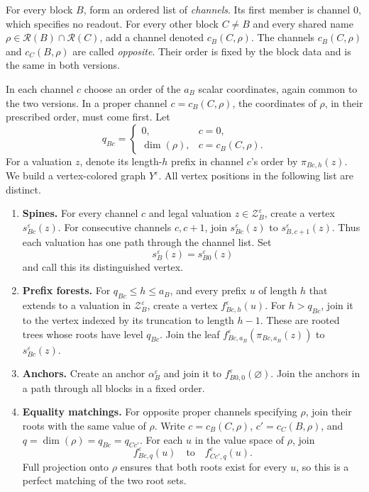 \documentclass[11pt]{article}
\theoremstyle{definition}
\begin{document}
For every block \(B\), form an ordered list of \emph{channels}.
Its first member is channel \(0\), which specifies no readout.
For every other block \(C\ne B\) and every shared name
\(\rho\in\mathcal R(B)\cap\mathcal R(C)\), add a channel denoted
\(c_B(C,\rho)\).
The channels \(c_B(C,\rho)\) and \(c_C(B,\rho)\) are called
\emph{opposite}.  Their order is fixed by the block data and is the
same in both versions.

In each channel \(c\) choose an order of the \(a_B\) scalar coordinates,
again common to the two versions.  In a proper channel
\(c=c_B(C,\rho)\), the coordinates of \(\rho\), in their prescribed
order, must come first.  Let
\[
 q_{Bc}=
 \begin{cases}
  0,&c=0,\\
  \dim(\rho),&c=c_B(C,\rho).
 \end{cases}
\]
For a valuation \(z\), denote its length-\(h\) prefix in channel \(c\)'s
order by \(\pi_{Bc,h}(z)\).
We build a vertex-colored graph \(Y^\varepsilon\).
All vertex positions in the following list are distinct.

\begin{enumerate}
\item
\textbf{Spines.}
For every channel \(c\) and legal valuation \(z\in\mathcal Z_B^\varepsilon\),
create a vertex \(s_{Bc}^\varepsilon(z)\).
For consecutive channels \(c,c+1\), join
\(s_{Bc}^\varepsilon(z)\) to \(s_{B,c+1}^\varepsilon(z)\).
Thus each valuation has one path through the channel list.
Set
\[
                  s_B^\varepsilon(z)=s_{B0}^\varepsilon(z)
\]
and call this its distinguished vertex.
\item
\textbf{Prefix forests.}
For \(q_{Bc}\le h\le a_B\), and every prefix \(u\) of length \(h\)
that extends to a valuation in \(\mathcal Z_B^\varepsilon\), create a vertex
\(f_{Bc,h}^\varepsilon(u)\).
For \(h>q_{Bc}\), join it to the vertex indexed by its truncation
to length \(h-1\).
These are rooted trees whose roots have level \(q_{Bc}\).
Join the leaf
\(f_{Bc,a_B}^\varepsilon(\pi_{Bc,a_B}(z))\)
to \(s_{Bc}^\varepsilon(z)\).
\item
\textbf{Anchors.}
Create an anchor \(\alpha_B^\varepsilon\) and join it to
\(f_{B0,0}^\varepsilon(\varnothing)\).
Join the anchors in a path through all blocks in a fixed order.
\item
\textbf{Equality matchings.}
For opposite proper channels specifying \(\rho\), join their roots
with the same value of \(\rho\).
Write \(c=c_B(C,\rho)\), \(c'=c_C(B,\rho)\), and
\(q=\dim(\rho)=q_{Bc}=q_{Cc'}\).
For each \(u\) in the value space of \(\rho\), join
\[
 f_{Bc,q}^\varepsilon(u)
 \quad\text{to}\quad
 f_{Cc',q}^\varepsilon(u).
\]
Full projection onto \(\rho\) ensures that both roots exist for every
\(u\), so this is a perfect matching of the two root sets.
\end{enumerate}
\end{document}
